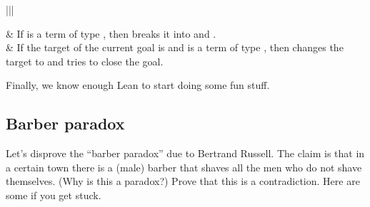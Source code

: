 \documentclass[letterpaper,10pt,english]{sphinxmanual}
\begin{document}
\begin{savenotes}\sphinxattablestart
\centering
\begin{tabular}[t]{|||}
\hline

\sphinxAtStartPar
{}
&
\sphinxAtStartPar
If  is a term of type , then
 breaks it into
 and .
\\
\hline
\sphinxAtStartPar
{}
&
\sphinxAtStartPar
If the target of the current goal is 
and  is a term of type , then
 changes the target to  and tries to close the goal.
\\
\hline
\end{tabular}
\par
\sphinxattableend\end{savenotes}

\sphinxAtStartPar
Finally, we know enough Lean to start doing some fun stuff.


\subsection{Barber paradox}
\label{\detokenize{day2:barber-paradox}}
\sphinxAtStartPar
Let’s disprove the “barber paradox” due to Bertrand Russell.
The claim is that in a certain town there is a (male) barber that shaves all the men who do not shave themselves. (Why is this a paradox?)
Prove that this is a contradiction.
Here are some  if you get stuck.
\end{document}
